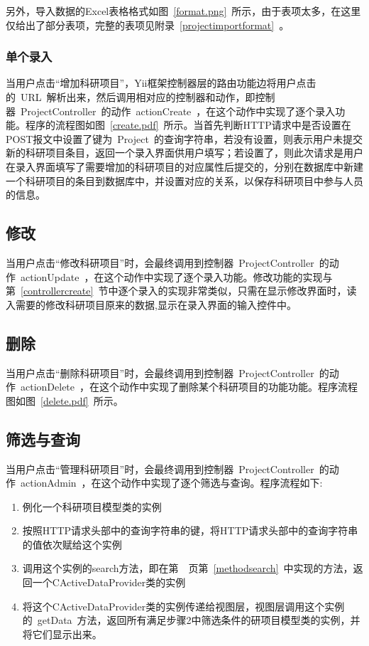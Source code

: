 
另外，导入数据的Excel表格格式如图~\ref{format.png}~所示，由于表项太多，在这里仅给出了部分表项，完整的表项见附录~\ref{projectimportformat}~。


\subsubsection{单个录入}

当用户点击“增加科研项目”，Yii框架控制器层的路由功能边将用户点击的~URL~解析出来，然后调用相对应的控制器和动作，即控制器~ProjectController~的动作~actionCreate~，在这个动作中实现了逐个录入功能。程序的流程图如图~\ref{create.pdf}~所示。当首先判断HTTP请求中是否设置在POST报文中设置了键为~Project~的查询字符串，若没有设置，则表示用户未提交新的科研项目条目，返回一个录入界面供用户填写；若设置了，则此次请求是用户在录入界面填写了需要增加的科研项目的对应属性后提交的，分别在数据库中新建一个科研项目的条目到数据库中，并设置对应的关系，以保存科研项目中参与人员的信息。



\subsection{修改}
当用户点击“修改科研项目”时，会最终调用到控制器~ProjectController~的动作~actionUpdate~，在这个动作中实现了逐个录入功能。修改功能的实现与第~\ref{controllercreate}~节中逐个录入的实现非常类似，只需在显示修改界面时，读入需要的修改科研项目原来的数据,显示在录入界面的输入控件中。

\subsection{删除}
当用户点击“删除科研项目”时，会最终调用到控制器~ProjectController~的动作~actionDelete~，在这个动作中实现了删除某个科研项目的功能功能。程序流程图如图~\ref{delete.pdf}~所示。



\subsection{筛选与查询}
当用户点击“管理科研项目”时，会最终调用到控制器~ProjectController~的动作~actionAdmin~，在这个动作中实现了逐个筛选与查询。程序流程如下:
\begin{enumerate}
\item 例化一个科研项目模型类的实例
\item 按照HTTP请求头部中的查询字符串的键，将HTTP请求头部中的查询字符串的值依次赋给这个实例
\item 调用这个实例的search方法，即在第~\pageref{methodsearch}~页第~\ref{methodsearch}~中实现的方法，返回一个CActiveDataProvider类的实例
\item 将这个CActiveDataProvider类的实例传递给视图层，视图层调用这个实例的~getData~方法，返回所有满足步骤2中筛选条件的研项目模型类的实例，并将它们显示出来。
\end{enumerate}

